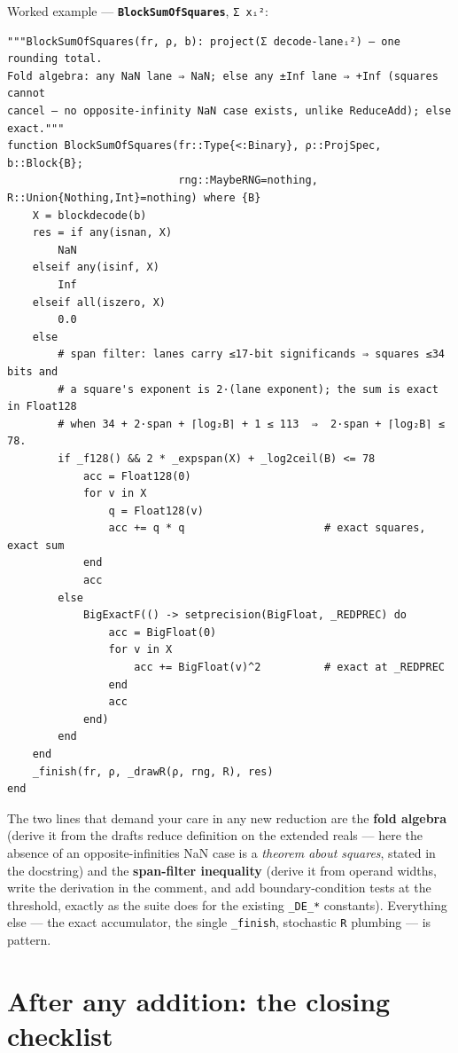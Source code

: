 Worked example — \textbf{\texttt{BlockSumOfSquares}}, \texttt{Σ xᵢ²}:




\begin{verbatim}
"""BlockSumOfSquares(fr, ρ, b): project(Σ decode-laneᵢ²) — one rounding total.
Fold algebra: any NaN lane ⇒ NaN; else any ±Inf lane ⇒ +Inf (squares cannot
cancel — no opposite-infinity NaN case exists, unlike ReduceAdd); else exact."""
function BlockSumOfSquares(fr::Type{<:Binary}, ρ::ProjSpec, b::Block{B};
                           rng::MaybeRNG=nothing, R::Union{Nothing,Int}=nothing) where {B}
    X = blockdecode(b)
    res = if any(isnan, X)
        NaN
    elseif any(isinf, X)
        Inf
    elseif all(iszero, X)
        0.0
    else
        # span filter: lanes carry ≤17-bit significands ⇒ squares ≤34 bits and
        # a square's exponent is 2·(lane exponent); the sum is exact in Float128
        # when 34 + 2·span + ⌈log₂B⌉ + 1 ≤ 113  ⇒  2·span + ⌈log₂B⌉ ≤ 78.
        if _f128() && 2 * _expspan(X) + _log2ceil(B) <= 78
            acc = Float128(0)
            for v in X
                q = Float128(v)
                acc += q * q                      # exact squares, exact sum
            end
            acc
        else
            BigExactF(() -> setprecision(BigFloat, _REDPREC) do
                acc = BigFloat(0)
                for v in X
                    acc += BigFloat(v)^2          # exact at _REDPREC
                end
                acc
            end)
        end
    end
    _finish(fr, ρ, _drawR(ρ, rng, R), res)
end
\end{verbatim}



The two lines that demand your care in any new reduction are the \textbf{fold algebra} (derive it from the draft{\textquotesingle}s reduce definition on the extended reals — here the absence of an opposite-infinities NaN case is a \emph{theorem about squares}, stated in the docstring) and the \textbf{span-filter inequality} (derive it from operand widths, write the derivation in the comment, and add boundary-condition tests at the threshold, exactly as the suite does for the existing \texttt{\_DE\_*} constants). Everything else — the exact accumulator, the single \texttt{\_finish}, stochastic \texttt{R} plumbing — is pattern.



\section{After any addition: the closing checklist}




